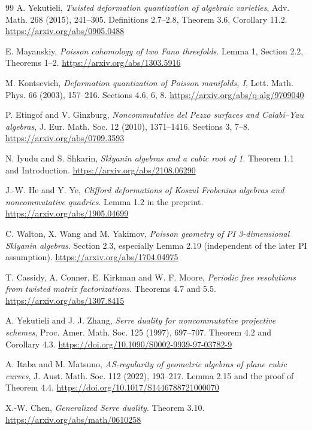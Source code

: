 \documentclass[a4paper,11pt]{ltjsarticle}
\theoremstyle{definition}
\begin{document}
\clearpage
\begin{thebibliography}{99}
\small
{}
A. Yekutieli,
\emph{Twisted deformation quantization of algebraic varieties},
Adv. Math. 268 (2015), 241--305.
Definitions 2.7--2.8, Theorem 3.6, Corollary 11.2.
\url{https://arxiv.org/abs/0905.0488}

E. Mayanskiy,
\emph{Poisson cohomology of two Fano threefolds}.
Lemma 1, Section 2.2, Theorems 1--2.
\url{https://arxiv.org/abs/1303.5916}

M. Kontsevich,
\emph{Deformation quantization of Poisson manifolds, I},
Lett. Math. Phys. 66 (2003), 157--216.
Sections 4.6, 6, 8.
\url{https://arxiv.org/abs/q-alg/9709040}

P. Etingof and V. Ginzburg,
\emph{Noncommutative del Pezzo surfaces and Calabi--Yau algebras},
J. Eur. Math. Soc. 12 (2010), 1371--1416.
Sections 3, 7--8.
\url{https://arxiv.org/abs/0709.3593}

N. Iyudu and S. Shkarin,
\emph{Sklyanin algebras and a cubic root of 1}.
Theorem 1.1 and Introduction.
\url{https://arxiv.org/abs/2108.06290}

J.-W. He and Y. Ye,
\emph{Clifford deformations of Koszul Frobenius algebras and noncommutative quadrics}.
Lemma 1.2 in the preprint.
\url{https://arxiv.org/abs/1905.04699}

C. Walton, X. Wang and M. Yakimov,
\emph{Poisson geometry of PI 3-dimensional Sklyanin algebras}.
Section 2.3, especially Lemma 2.19 (independent of the later PI assumption).
\url{https://arxiv.org/abs/1704.04975}

T. Cassidy, A. Conner, E. Kirkman and W. F. Moore,
\emph{Periodic free resolutions from twisted matrix factorizations}.
Theorems 4.7 and 5.5.
\url{https://arxiv.org/abs/1307.8415}

A. Yekutieli and J. J. Zhang,
\emph{Serre duality for noncommutative projective schemes},
Proc. Amer. Math. Soc. 125 (1997), 697--707.
Theorem 4.2 and Corollary 4.3.
\url{https://doi.org/10.1090/S0002-9939-97-03782-9}

A. Itaba and M. Matsuno,
\emph{AS-regularity of geometric algebras of plane cubic curves},
J. Aust. Math. Soc. 112 (2022), 193--217.
Lemma 2.15 and the proof of Theorem 4.4.
\url{https://doi.org/10.1017/S1446788721000070}

X.-W. Chen,
\emph{Generalized Serre duality}.
Theorem 3.10.
\url{https://arxiv.org/abs/math/0610258}


\end{thebibliography}
\end{document}
